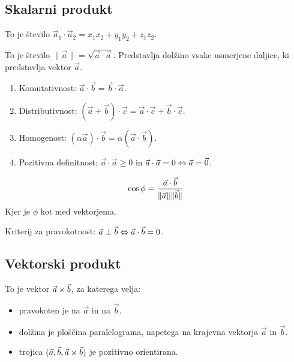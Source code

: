 \subsection{Skalarni produkt}


To je število $\vec{a}_1 \cdot \vec{a}_2 = x_1 x_2 + y_1 y_2 + z_1 z_2$.


To je število $\| \vec{a} \| = \sqrt{\vec{a} \cdot \vec{a}}$. Predstavlja dolžino vsake usmerjene daljice, ki predstavlja vektor $\vec{a}$.


\begin{enumerate}
	\item Komutativnost: $\vec{a} \cdot \vec{b} = \vec{b} \cdot \vec{a}$.
	\item Distributivnost: $(\vec{a} + \vec{b}) \cdot \vec{c} = \vec{a} \cdot \vec{c} + \vec{b} \cdot \vec{c}$.
	\item Homogenost: $(\alpha \vec{a}) \cdot \vec{b} = \alpha (\vec{a} \cdot \vec{b})$.
	\item Pozitivna definitnost: $\vec{a} \cdot \vec{a} \ge 0$ in $\vec{a} \cdot \vec{a} = 0 \Leftrightarrow \vec{a} = \vec{0}$.~
\end{enumerate}


\[
	\cos \phi = \frac{\vec{a} \cdot \vec{b}}{\| \vec{a} \| \| \vec{b} \|}
\]
Kjer je $\phi$ kot med vektorjema.

Kriterij za pravokotnost: $\vec{a} \perp \vec{b} \Leftrightarrow \vec{a} \cdot \vec{b} = 0$.

\subsection{Vektorski produkt}


To je vektor $\vec{a} \times \vec{b}$, za katerega velja:
\begin{itemize}
	\item pravokoten je na $\vec{a}$ in na $\vec{b}$.
	\item dolžina je ploščina paralelograma, napetega na krajevna vektorja $\vec{a}$ in $\vec{b}$.
	\item trojica $(\vec{a}, \vec{b}, \vec{a} \times \vec{b})$ je pozitivno orientirana.
\end{itemize}

